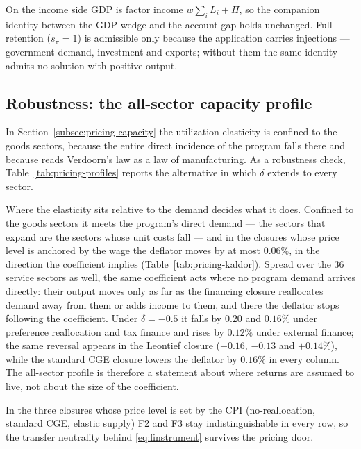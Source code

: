 On the income side GDP is factor income $w\sum_i L_i + \Pi$, so the companion identity
between the GDP wedge and the account gap holds unchanged. Full retention ($s_\pi = 1$)
is admissible only because the application carries injections --- government demand,
investment and exports; without them the same identity admits no solution with positive
output.

\subsection{Robustness: the all-sector capacity profile}\label{app:profiles}

In Section~\ref{subsec:pricing-capacity} the utilization elasticity is confined to
the goods sectors, because the entire direct incidence of the program falls
there and because \textcite{Kaldor1966} reads Verdoorn's law as a law of
manufacturing. As a robustness check, Table~\ref{tab:pricing-profiles} reports the
alternative in which $\delta$ extends to every sector.

Where the elasticity sits relative to the demand decides what it does. Confined to
the goods sectors it meets the program's direct demand --- the sectors that expand are
the sectors whose unit costs fall --- and in the closures whose price level is anchored
by the wage the deflator moves by at most $0.06\%$, in the direction the
coefficient implies (Table~\ref{tab:pricing-kaldor}). Spread over the 36 service
sectors as well, the same coefficient acts where no program demand arrives directly:
their output moves only as far as the financing closure reallocates demand away from
them or adds income to them, and there the deflator stops following the coefficient.
Under $\delta = -0.5$ it falls by $0.20$ and $0.16\%$ under preference
reallocation and tax finance and rises by $0.12\%$ under external finance; the
same reversal appears in the Leontief closure ($-0.16$, $-0.13$ and $+0.14\%$),
while the standard CGE closure lowers the deflator by $0.16\%$ in every column.
The all-sector profile is therefore a statement about where returns are assumed to
live, not about the size of the coefficient.

In the three closures whose price level is set by the CPI (no-reallocation,
standard CGE, elastic supply) F2 and F3 stay indistinguishable in every row, so
the transfer neutrality behind \eqref{eq:finstrument} survives the pricing
door.

\clearpage

